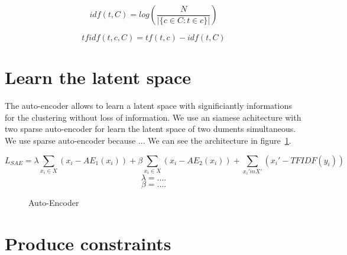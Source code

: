 \documentclass{article}
\begin{document}
\begin{equation}\label{eq:idf}
  idf(t, C) = log(\frac{N}{| \{ c \in C : t \in c \}  |})
\end{equation}

\begin{equation}\label{eq:tfidf}
  tfidf(t,c,C) = tf(t,c) - idf(t,C)
\end{equation}


\section{Learn the latent space}

The auto-encoder allows to learn a latent space with significiantly
informations for the clustering without loss of information.
We use an siamese achitecture with two sparse auto-encoder for learn
the latent space of two duments simultaneous. We use sparse
auto-encoder because ...
We can see the architecture in figure~\ref{fig:archi}.

\begin{equation}\label{eq:tf-idf}
  L_{SAE}= \lambda\sum_{x_i \in X} (x_i - AE_1(x_i)) +
  \beta \sum_{x_i \in X} (x_i - AE_2(x_i)) +
  \sum_{x_i' in X'} (x_i' - TFIDF(y_i))
\end{equation}
\begin{equation}\label{eq:lambda}
  \lambda = ....
\end{equation}
\begin{equation}\label{eq:beta}
  \beta = ....
\end{equation}

\begin{figure}[!t]
  \centering
  
  \caption{Auto-Encoder}
  \label{fig:archi}
\end{figure}
\section{Produce constraints}
\end{document}
